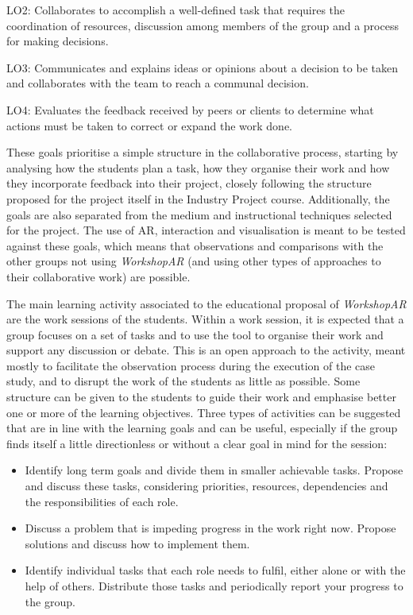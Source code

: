 \begin{displayquote}
    LO2: Collaborates to accomplish a well-defined task that requires the coordination of resources, discussion among members of the group and a process for making
    decisions.
\end{displayquote}

\begin{displayquote}
    LO3: Communicates and explains ideas or opinions about a decision to be taken and collaborates with the team to reach a communal decision.
\end{displayquote}

\begin{displayquote}
    LO4: Evaluates the feedback received by peers or clients to determine what actions must be taken to correct or expand the work done.
\end{displayquote}

These goals prioritise a simple structure in the collaborative process, starting by analysing how the students plan a task, how they organise their work and how they
incorporate feedback into their project, closely following the structure proposed for the project itself in the Industry Project course. Additionally, the goals are also
separated from the medium and instructional techniques selected for the project. The use of \ac{AR}, interaction and visualisation is meant to be tested against these
goals, which means that observations and comparisons with the other groups not using \emph{WorkshopAR} (and using other types of approaches to their collaborative work) are possible.

The main learning activity associated to the educational proposal of \emph{WorkshopAR} are the work sessions of the students. Within a work session, it is expected that a group
focuses on a set of tasks and to use the tool to organise their work and support any discussion or debate. This is an open approach to the activity, meant mostly to facilitate
the observation process during the execution of the case study, and to disrupt the work of the students as little as possible. Some structure can be given to the students to guide
their work and emphasise better one or more of the learning objectives. Three types of activities can be suggested that are in line with the learning goals and can be useful,
especially if the group finds itself a little directionless or without a clear goal in mind for the session:

\begin{itemize}
    \item Identify long term goals and divide them in smaller achievable tasks. Propose and discuss these tasks, considering priorities, resources, dependencies and the
    responsibilities of each role.
    \item Discuss a problem that is impeding progress in the work right now. Propose solutions and discuss how to implement them.
    \item Identify individual tasks that each role needs to fulfil, either alone or with the help of others. Distribute those tasks and periodically report your progress
    to the group.
\end{itemize}

